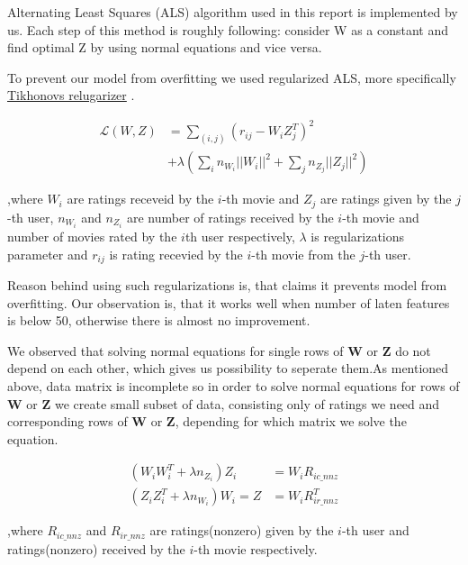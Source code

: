 Alternating Least Squares (ALS) algorithm used in this report is implemented by us. Each step of this method is roughly following: consider W as a constant and find optimal Z by using normal equations and vice versa. 

To prevent our model from overfitting we used regularized ALS, more specifically 
\href{https://en.wikipedia.org/wiki/Tikhonov_regularization}{Tikhonovs relugarizer}
. 

\begin{align}
  \mathcal{L}(W,Z)&=\sum_{(i,j)}(r_{ij}-W_iZ_j^T)^2 \\
  &+\lambda(\sum_i n_{W_i}||W_i||^2+\sum_j n_{Z_j}||Z_j||^2)
\end{align}

,where $W_i$ are ratings receveid by the $i$-th movie and $Z_j$ are ratings given by the $j$-th user,  $n_{W_i}$ and $n_{Z_i}$ are number of ratings received by the $i$-th movie and number of movies rated by the $i$th user respectively, $\lambda$ is regularizations parameter and $r_{ij}$ is rating recevied by the $i$-th movie from the $j$-th user.

Reason behind using such regularizations is, that 
\cite{Zhou2008}
 claims it prevents model from overfitting. Our observation is, that it works well when number of laten features is below 50, otherwise there is almost no improvement. 

We observed that solving normal equations for single rows of $\textbf{W}$ or $\textbf{Z}$ do not depend on each other, which gives us possibility to seperate them.As mentioned above, data matrix is incomplete so in order to solve normal equations for rows of $\textbf{W}$  or $\textbf{Z}$ we create small subset of data, consisting only of ratings we need and corresponding rows of $\textbf{W}$ or $\textbf{Z}$, depending for which matrix we solve the equation. 

\begin{align}
  (W_iW_i^T + \lambda n_{Z_i})Z_i&=W_iR_{ic\_nnz} \\
(Z_iZ_i^T + \lambda n_{W_i})W_i=Z&=W_iR^T_{ir\_nnz}
\end{align}


,where $R_{ic\_nnz}$ and $R_{ir\_nnz}$ are ratings(nonzero) given by the $i$-th user and ratings(nonzero) received by the $i$-th movie respectively.




